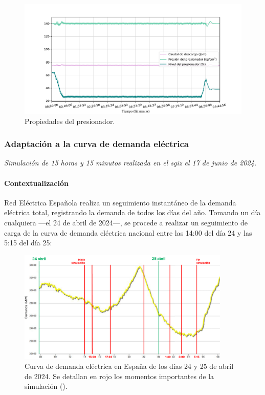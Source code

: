 \begin{figure}[!h]
  \centering
  \includegraphics[width=\textwidth]{content/figures/sim3_presionador.pdf}
  \caption{Propiedades del presionador.}
  \label{fig:sim3_presionador}
\end{figure}


\newpage
\subsubsection{Adaptación a la curva de demanda eléctrica}

\textit{Simulación de 15 horas y 15 minutos realizada en el \acrshort{sgiz} el 17 de junio de 2024.}

\paragraph{Contextualización}

Red Eléctrica Española realiza un seguimiento instantáneo de la demanda eléctrica total, registrando la demanda de todos los días del año. Tomando un día cualquiera ---el 24 de abril de 2024---, se procede a realizar un seguimiento de carga de la curva de demanda eléctrica nacional entre las 14:00 del día 24 y las 5:15 del día 25:

\begin{figure}[!h]
  \centering
  \includegraphics[width=0.9\textwidth]{content/figures/curva_demanda.pdf}
  \caption{Curva de demanda eléctrica en España de los días 24 y 25 de abril de 2024. Se detallan en rojo los momentos importantes de la simulación (\cite{ree_demanda}).}
  \label{fig:curva_demanda}
\end{figure}

